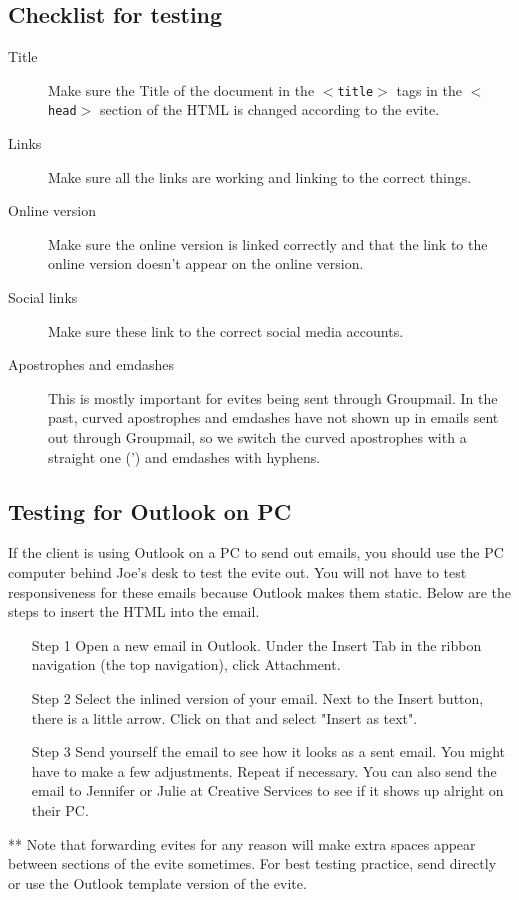\documentclass[a4paper,11pt]{article}
\begin{document}
	\subsection{Checklist for testing}
	\begin{description}
		\item[Title] Make sure the Title of the document in the \texttt{$<$title$>$} tags in the \texttt{$<$head$>$} section of the HTML is changed according to the evite. 
		\item[Links] Make sure all the links are working and linking to the correct things.
		\item[Online version] Make sure the online version is linked correctly and that the link to the online version doesn't appear on the online version.
		\item[Social links] Make sure these link to the correct social media accounts.
		\item[Apostrophes and emdashes] This is mostly important for evites being sent through Groupmail. In the past, curved apostrophes and emdashes have not shown up in emails sent out through Groupmail, so we switch the curved apostrophes with a straight one (') and emdashes with hyphens.
	\end{description} 
	
	\subsection{Testing for Outlook on PC}
	If the client is using Outlook on a PC to send out emails, you should use the PC computer behind Joe's desk to test the evite out. You will not have to test responsiveness for these emails because Outlook makes them static. Below are the steps to insert the HTML into the email.
	\begin{itemize}
		\item[Step 1] Open a new email in Outlook. Under the Insert Tab in the ribbon navigation (the top navigation), click Attachment.
		\item[Step 2] Select the inlined version of your email. Next to the Insert button, there is a little arrow. Click on that and select "Insert as text".
		\item[Step 3] Send yourself the email to see how it looks as a sent email. You might have to make a few adjustments. Repeat if necessary. You can also send the email to Jennifer or Julie at Creative Services to see if it shows up alright on their PC. 
	\end{itemize}
	** Note that forwarding evites for any reason will make extra spaces appear between sections of the evite sometimes. For best testing practice, send directly or use the Outlook template version of the evite.
	
\end{document}
